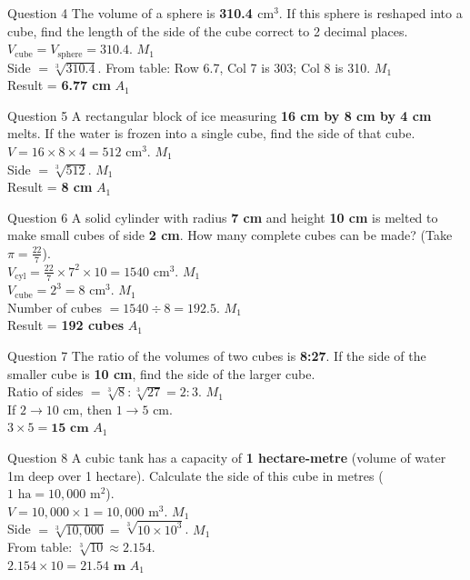 \documentclass[12pt, a4paper, oneside]{article}
\begin{document}
\begin{solvingbox}{Question 4}
The volume of a sphere is \textbf{310.4 $\text{cm}^3$}. If this sphere is reshaped into a cube, find the length of the side of the cube correct to 2 decimal places. \\
$V_{\text{cube}} = V_{\text{sphere}} = 310.4$. \hfill $M_1$ \\
Side $= \sqrt[3]{310.4}$. From table: Row 6.7, Col 7 is 303; Col 8 is 310. \hfill $M_1$ \\
Result = \textbf{6.77 cm} \hfill $A_1$
\end{solvingbox}

\begin{solvingbox}{Question 5}
A rectangular block of ice measuring \textbf{16 cm by 8 cm by 4 cm} melts. If the water is frozen into a single cube, find the side of that cube. \\
$V = 16 \times 8 \times 4 = 512\text{ cm}^3$. \hfill $M_1$ \\
Side $= \sqrt[3]{512}$. \hfill $M_1$ \\
Result = \textbf{8 cm} \hfill $A_1$
\end{solvingbox}

\begin{solvingbox}{Question 6}
A solid cylinder with radius \textbf{7 cm} and height \textbf{10 cm} is melted to make small cubes of side \textbf{2 cm}. How many complete cubes can be made? (Take $\pi = \frac{22}{7}$). \\
$V_{\text{cyl}} = \frac{22}{7} \times 7^2 \times 10 = 1540\text{ cm}^3$. \hfill $M_1$ \\
$V_{\text{cube}} = 2^3 = 8\text{ cm}^3$. \hfill $M_1$ \\
Number of cubes $= 1540 \div 8 = 192.5$. \hfill $M_1$ \\
Result = \textbf{192 cubes} \hfill $A_1$
\end{solvingbox}

\begin{solvingbox}{Question 7}
The ratio of the volumes of two cubes is \textbf{8:27}. If the side of the smaller cube is \textbf{10 cm}, find the side of the larger cube. \\
Ratio of sides $= \sqrt[3]{8} : \sqrt[3]{27} = 2:3$. \hfill $M_1$ \\
If $2 \to 10\text{ cm}$, then $1 \to 5\text{ cm}$. \\
$3 \times 5 = \mathbf{15\text{ cm}}$ \hfill $A_1$
\end{solvingbox}

\begin{solvingbox}{Question 8}
A cubic tank has a capacity of \textbf{1 hectare-metre} (volume of water 1m deep over 1 hectare). Calculate the side of this cube in metres ($1\text{ ha} = 10,000\text{ m}^2$). \\
$V = 10,000 \times 1 = 10,000\text{ m}^3$. \hfill $M_1$ \\
Side $= \sqrt[3]{10,000} = \sqrt[3]{10 \times 10^3}$. \hfill $M_1$ \\
From table: $\sqrt[3]{10} \approx 2.154$. \\
$2.154 \times 10 = \mathbf{21.54\text{ m}}$ \hfill $A_1$
\end{solvingbox}
\end{document}
